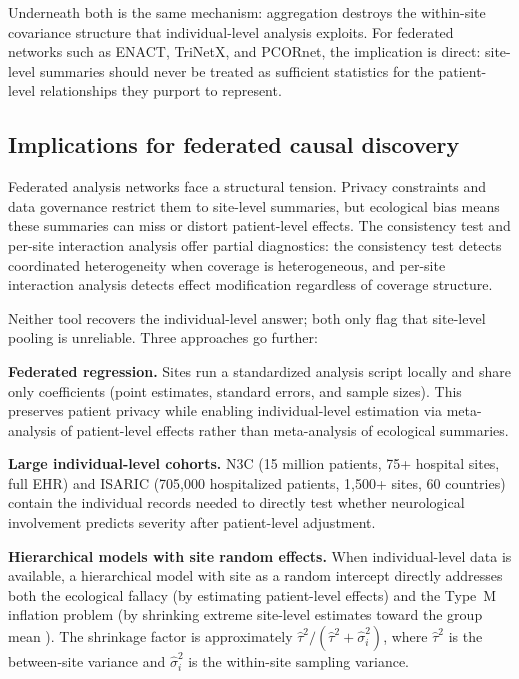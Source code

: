 \documentclass{article}
\begin{document}
Underneath both is the same mechanism: aggregation destroys the within-site
covariance structure that individual-level analysis exploits.  For
federated networks such as ENACT, TriNetX, and PCORnet, the implication
is direct: site-level summaries should never be treated as sufficient
statistics for the patient-level relationships they purport to represent.

\subsection{Implications for federated causal discovery}

Federated analysis networks face a structural tension.  Privacy
constraints and data governance restrict them to site-level summaries, but
ecological bias means these summaries can miss or distort patient-level
effects.  The consistency test and per-site interaction
analysis offer partial diagnostics: the consistency test detects
coordinated heterogeneity when coverage is heterogeneous, and per-site
interaction analysis detects effect modification regardless of coverage
structure.

Neither tool recovers the individual-level answer; both only flag that
site-level pooling is unreliable.  Three approaches go further:

\textbf{Federated regression.}  Sites run a standardized analysis script
locally and share only coefficients (point estimates, standard errors, and
sample sizes).  This preserves patient privacy while enabling
individual-level estimation via meta-analysis of patient-level effects
rather than meta-analysis of ecological summaries.

\textbf{Large individual-level cohorts.}  N3C (15 million patients, 75+
hospital sites, full EHR) and ISARIC (705,000 hospitalized patients,
1,500+ sites, 60 countries) contain the individual records needed to
directly test whether neurological involvement predicts severity after
patient-level adjustment.

\textbf{Hierarchical models with site random effects.}  When
individual-level data is available, a hierarchical model with site as a
random intercept directly addresses both the ecological fallacy (by
estimating patient-level effects) and the Type~M inflation problem (by
shrinking extreme site-level estimates toward the group mean
\cite{gelman2012multilevel}).  The shrinkage factor is approximately
$\hat\tau^2 / (\hat\tau^2 + \hat\sigma_i^2)$, where $\hat\tau^2$ is
the between-site variance and $\hat\sigma_i^2$ is the within-site
sampling variance.
\end{document}
